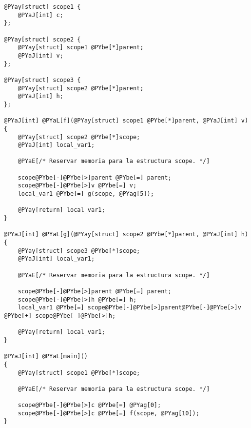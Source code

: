 \begin{Verbatim}[commandchars=@\[\]]
@PYay[struct] scope1 {
    @PYaJ[int] c;
};

@PYay[struct] scope2 {
    @PYay[struct] scope1 @PYbe[*]parent;
    @PYaJ[int] v;
};

@PYay[struct] scope3 {
    @PYay[struct] scope2 @PYbe[*]parent;
    @PYaJ[int] h;
};

@PYaJ[int] @PYaL[f](@PYay[struct] scope1 @PYbe[*]parent, @PYaJ[int] v)
{
    @PYay[struct] scope2 @PYbe[*]scope;
    @PYaJ[int] local_var1;

    @PYaE[/* Reservar memoria para la estructura scope. */]

    scope@PYbe[-]@PYbe[>]parent @PYbe[=] parent;
    scope@PYbe[-]@PYbe[>]v @PYbe[=] v;
    local_var1 @PYbe[=] g(scope, @PYag[5]);

    @PYay[return] local_var1;
}

@PYaJ[int] @PYaL[g](@PYay[struct] scope2 @PYbe[*]parent, @PYaJ[int] h)
{
    @PYay[struct] scope3 @PYbe[*]scope;
    @PYaJ[int] local_var1;

    @PYaE[/* Reservar memoria para la estructura scope. */]

    scope@PYbe[-]@PYbe[>]parent @PYbe[=] parent;
    scope@PYbe[-]@PYbe[>]h @PYbe[=] h;
    local_var1 @PYbe[=] scope@PYbe[-]@PYbe[>]parent@PYbe[-]@PYbe[>]v @PYbe[+] scope@PYbe[-]@PYbe[>]h;

    @PYay[return] local_var1;
}

@PYaJ[int] @PYaL[main]()
{
    @PYay[struct] scope1 @PYbe[*]scope;

    @PYaE[/* Reservar memoria para la estructura scope. */]

    scope@PYbe[-]@PYbe[>]c @PYbe[=] @PYag[0];
    scope@PYbe[-]@PYbe[>]c @PYbe[=] f(scope, @PYag[10]);
}
\end{Verbatim}
